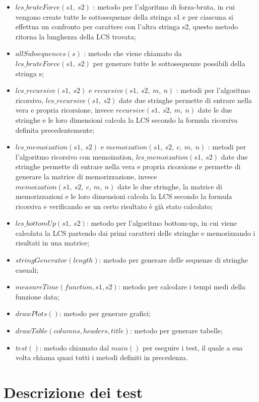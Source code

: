 \documentclass{article}
\begin{document}
\begin{itemize}
    \item $lcs\_bruteForce(s1,\ s2)$ : metodo per l'algoritmo di forza-bruta, in cui vengono create tutte le sottosequenze della stringa s1 e per ciascuna si effettua un confronto per carattere con l'altra stringa s2, questo metodo ritorna la lunghezza della LCS trovata;
    \item $allSubsequences(s)$ : metodo che viene chiamato da $lcs\_bruteForce(s1,\ s2)$ per generare tutte le sottosequenze possibili della stringa s;
    \item $lcs\_recursive(s1,\ s2)$ e $recursive(s1,\ s2,\ m,\ n)$ : metodi per l'algoritmo ricorsivo, $lcs\_recursive(s1,\ s2)$ date due stringhe permette di entrare nella vera e propria ricorsione, invece $recursive(s1,\ s2,\ m,\ n)$ date le due stringhe e le loro dimensioni calcola la LCS secondo la formula ricorsiva definita precedentemente; 
    \item $lcs\_memoization(s1,\ s2)$ e $memoization(s1,\ s2,\ c,\ m,\ n)$ : metodi per l'algoritmo ricorsivo con memoization, $lcs\_memoization(s1,\ s2)$ date due stringhe permette di entrare nella vera e propria ricorsione e permette di generare la matrice di memorizzazione, invece $memoization(s1,\ s2,\ c,\ m,\ n)$ date le due stringhe, la matrice di memorizzazioni e le loro dimensioni calcola la LCS secondo la formula ricorsiva e verificando se un certo risultato è già stato calcolato;
    \item $lcs\_bottomUp(s1,\ s2)$: metodo per l'algoritmo bottom-up, in cui viene calcolata la LCS partendo dai primi caratteri delle stringhe e memorizzando i risultati in una matrice; 
    \item $stringGenerator(length)$: metodo per generare delle sequenze di stringhe casuali;
    \item $measureTime(function, s1, s2)$: metodo per calcolare i tempi medi della funzione data;
    \item $drawPlots()$: metodo per generare grafici;
    \item $drawTable(columns, headers, title)$: metodo per generare tabelle;
    \item $test()$: metodo chiamato dal $main()$ per eseguire i test, il quale a sua volta chiama quasi tutti i metodi definiti in precedenza.
\end{itemize}

\newpage

\section{Descrizione dei test}
\end{document}
